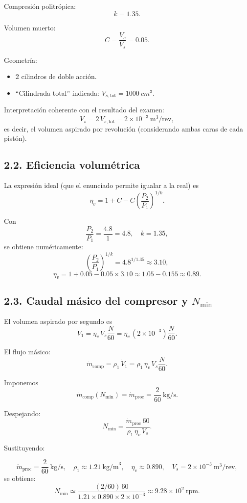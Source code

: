 \documentclass[11pt,a4paper]{article}
\begin{document}
Compresión politrópica:
\[
k = 1.35.
\]

Volumen muerto:
\[
C = \frac{V_c}{V_s} = 0.05.
\]

Geometría:
\begin{itemize}
  \item 2 cilindros de doble acción.
  \item ``Cilindrada total'' indicada: $V_{s,\text{tot}} = \SI{1000}{cm^3}$.
\end{itemize}

Interpretación coherente con el resultado del examen:
\[
V_s = 2\,V_{s,\text{tot}} = 2\times 10^{-3}\ \mathrm{m}^3/\text{rev},
\]
es decir, el volumen aspirado por revolución (considerando ambas caras de cada pistón).

\subsection*{2.2. Eficiencia volumétrica}

La expresión ideal (que el enunciado permite igualar a la real) es
\[
\eta_v = 1 + C - C\left(\frac{P_2}{P_1}\right)^{1/k}.
\]

Con
\[
\frac{P_2}{P_1} = \frac{4.8}{1} = 4.8,
\quad k = 1.35,
\]
se obtiene numéricamente:
\[
\left(\frac{P_2}{P_1}\right)^{1/k}
= 4.8^{1/1.35} \approx 3.10,
\]
\[
\eta_v = 1 + 0.05 - 0.05\times 3.10
       \approx 1.05 - 0.155
       \approx 0.89.
\]

\subsection*{2.3. Caudal másico del compresor y $N_{\min}$}

El volumen aspirado por segundo es
\[
\dot V_1 = \eta_v\,V_s \frac{N}{60}
         = \eta_v\,(2\times10^{-3})\frac{N}{60}.
\]

El flujo másico:
\[
\dot m_{\text{comp}} = \rho_1\,\dot V_1
= \rho_1\,\eta_v\,V_s\frac{N}{60}.
\]

Imponemos
\[
\dot m_{\text{comp}}(N_{\min}) = \dot m_{\text{proc}} = \frac{2}{60}\ \mathrm{kg/s}.
\]

Despejando:
\[
N_{\min}
= \frac{\dot m_{\text{proc}}\,60}{\rho_1\,\eta_v\,V_s}.
\]

Sustituyendo:

\[
\dot m_{\text{proc}} = \frac{2}{60}\ \mathrm{kg/s},\quad
\rho_1 \approx 1.21\ \mathrm{kg/m}^3,\quad
\eta_v \approx 0.890,\quad
V_s = 2\times10^{-3}\ \mathrm{m}^3/\text{rev},
\]
se obtiene:
\[
N_{\min}
\simeq \frac{(2/60)\,60}{1.21\times 0.890\times 2\times10^{-3}}
\approx 9.28\times10^2\ \mathrm{rpm}.
\]
\end{document}
